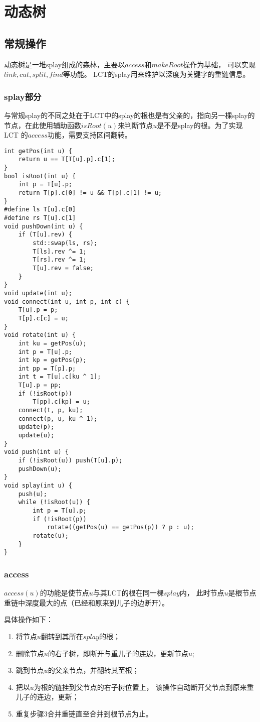 \section{动态树}
\subsection{常规操作}
动态树是一堆splay组成的森林，主要以$access$和$makeRoot$操作为基础，
可以实现$link,cut,split,find$等功能。
LCT的splay用来维护以深度为关键字的重链信息。

\subsubsection{splay部分}
与常规splay的不同之处在于LCT中的splay的根也是有父亲的，指向另一棵splay的
节点，在此使用辅助函数$isRoot(u)$来判断节点$u$是不是splay的根。为了实现LCT
的$access$功能，需要支持区间翻转。

\begin{lstlisting}[title=splay]
int getPos(int u) {
    return u == T[T[u].p].c[1];
}
bool isRoot(int u) {
    int p = T[u].p;
    return T[p].c[0] != u && T[p].c[1] != u;
}
#define ls T[u].c[0]
#define rs T[u].c[1]
void pushDown(int u) {
    if (T[u].rev) {
        std::swap(ls, rs);
        T[ls].rev ^= 1;
        T[rs].rev ^= 1;
        T[u].rev = false;
    }
}
void update(int u);
void connect(int u, int p, int c) {
    T[u].p = p;
    T[p].c[c] = u;
}
void rotate(int u) {
    int ku = getPos(u);
    int p = T[u].p;
    int kp = getPos(p);
    int pp = T[p].p;
    int t = T[u].c[ku ^ 1];
    T[u].p = pp;
    if (!isRoot(p))
        T[pp].c[kp] = u;
    connect(t, p, ku);
    connect(p, u, ku ^ 1);
    update(p);
    update(u);
}
void push(int u) {
    if (!isRoot(u)) push(T[u].p);
    pushDown(u);
}
void splay(int u) {
    push(u);
    while (!isRoot(u)) {
        int p = T[u].p;
        if (!isRoot(p))
            rotate((getPos(u) == getPos(p)) ? p : u);
        rotate(u);
    }
}
\end{lstlisting}
\subsubsection{access}
$access(u)$的功能是使节点$u$与其LCT的根在同一棵$splay$内，
此时节点$u$是根节点重链中深度最大的点（已经和原来到儿子的边断开）。

具体操作如下：

\begin{enumerate}
    \item 将节点$u$翻转到其所在$splay$的根；
    \item 删除节点$u$的右子树，即断开与重儿子的连边，更新节点$u$;
    \item 跳到节点$u$的父亲节点，并翻转其至根；
    \item 把以$u$为根的链挂到父节点的右子树位置上，
        该操作自动断开父节点到原来重儿子的连边，更新；
    \item 重复步骤3合并重链直至合并到根节点为止。
\end{enumerate}

